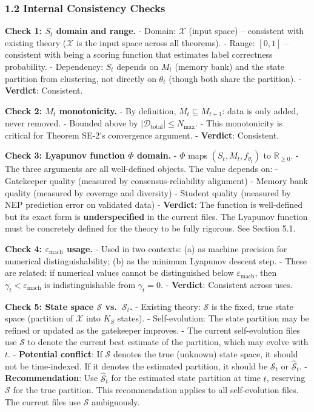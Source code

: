 \documentclass[
  12pt,
]{ctexart}
\begin{document}
\subsubsection{1.2 Internal Consistency
Checks}\label{internal-consistency-checks}

\textbf{Check 1: \(S_t\) domain and range.} - Domain: \(\mathcal{X}\)
(input space) -- consistent with existing theory (\(\mathcal{X}\) is the
input space across all theorems). - Range: \([0,1]\) -- consistent with
being a scoring function that estimates label correctness probability. -
Dependency: \(S_t\) depends on \(M_t\) (memory bank) and the state
partition from clustering, not directly on \(\theta_t\) (though both
share the partition). - \textbf{Verdict}: Consistent.

\textbf{Check 2: \(M_t\) monotonicity.} - By definition,
\(M_t \subseteq M_{t+1}\): data is only added, never removed. - Bounded
above by \(|\mathcal{D}_{\text{total}}| \leq N_{\text{max}}\). - This
monotonicity is critical for Theorem SE-2's convergence argument. -
\textbf{Verdict}: Consistent.

\textbf{Check 3: Lyapunov function \(\Phi\) domain.} - \(\Phi\) maps
\((S_t, M_t, f_{\theta_t})\) to \(\mathbb{R}_{\geq 0}\). - The three
arguments are all well-defined objects. The value depends on: -
Gatekeeper quality (measured by consensus-reliability alignment) -
Memory bank quality (measured by coverage and diversity) - Student
quality (measured by NEP prediction error on validated data) -
\textbf{Verdict}: The function is well-defined but its exact form is
\textbf{underspecified} in the current files. The Lyapunov function must
be concretely defined for the theory to be fully rigorous. See Section
5.1.

\textbf{Check 4: \(\varepsilon_{\text{mach}}\) usage.} - Used in two
contexts: (a) as machine precision for numerical distinguishability; (b)
as the minimum Lyapunov descent step. - These are related: if numerical
values cannot be distinguished below \(\varepsilon_{\text{mach}}\), then
\(\gamma_t < \varepsilon_{\text{mach}}\) is indistinguishable from
\(\gamma_t = 0\). - \textbf{Verdict}: Consistent across uses.

\textbf{Check 5: State space \(\mathcal{S}\) vs.~\(\mathcal{S}_t\).} -
Existing theory: \(\mathcal{S}\) is the fixed, true state space
(partition of \(\mathcal{X}\) into \(K_S\) states). - Self-evolution:
The state partition may be refined or updated as the gatekeeper
improves. - The current self-evolution files use \(\mathcal{S}\) to
denote the current best estimate of the partition, which may evolve with
\(t\). - \textbf{Potential conflict}: If \(\mathcal{S}\) denotes the
true (unknown) state space, it should not be time-indexed. If it denotes
the estimated partition, it should be \(\mathcal{S}_t\) or
\(\hat{\mathcal{S}}_t\). - \textbf{Recommendation}: Use
\(\hat{\mathcal{S}}_t\) for the estimated state partition at time \(t\),
reserving \(\mathcal{S}\) for the true partition. This recommendation
applies to all self-evolution files. The current files use
\(\mathcal{S}\) ambiguously.
\end{document}
